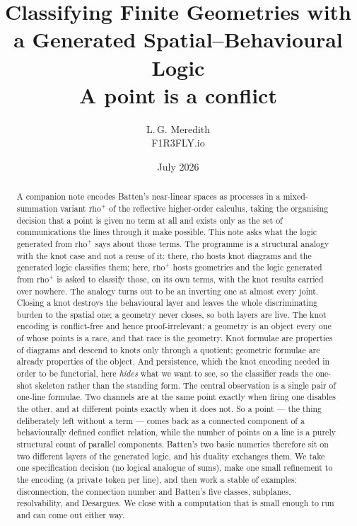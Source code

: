 \documentclass[11pt]{article}
\title{Classifying Finite Geometries with a Generated Spatial--Behavioural Logic\\
\large A point is a conflict}
\author{L.\,G. Meredith\\ \small F1R3FLY.io}
\date{July 2026}
\theoremstyle{plain}
\theoremstyle{definition}
\newcommand{\rhoplus}{\mathrm{rho}^{+}}
\begin{document}
\maketitle

\begin{abstract}
A companion note encodes Batten's near-linear spaces as processes in a mixed-summation
variant $\rhoplus$ of the reflective higher-order calculus, taking the organising decision that a
point is given no term at all and exists only as the set of communications the lines through it
make possible. This note asks what the logic generated from $\rhoplus$ says about those terms.
The programme is a structural analogy with the knot case and not a reuse of it: there,
rho hosts knot diagrams and the generated logic classifies them; here, $\rhoplus$ hosts
geometries and the logic generated from $\rhoplus$ is asked to classify those, on its own terms,
with the knot results carried over nowhere.
The analogy turns out to be an inverting one at almost every joint. Closing a knot destroys the
behavioural layer and leaves the whole discriminating burden to the spatial one; a geometry never
closes, so both layers are live. The knot encoding is conflict-free and hence proof-irrelevant; a
geometry is an object every one of whose points is a race, and that race is the geometry. Knot
formulae are properties of diagrams and descend to knots only through a quotient; geometric
formulae are already properties of the object. And persistence, which the knot encoding needed in
order to be functorial, here \emph{hides} what we want to see, so the classifier reads the
one-shot skeleton rather than the standing form.
The central observation is a single pair of one-line formulae. Two channels are at the same point
exactly when firing one disables the other, and at different points exactly when it does not. So a
point --- the thing deliberately left without a term --- comes back as a connected component of a
behaviourally defined conflict relation, while the number of points on a line is a purely
structural count of parallel components. Batten's two basic numerics therefore sit on two
different layers of the generated logic, and his duality exchanges them.
We take one specification decision (no logical analogue of sums), make one small refinement to the
encoding (a private token per line), and then work a stable of examples: disconnection, the
connection number and Batten's five classes, subplanes, resolvability, and Desargues. We close
with a computation that is small enough to run and can come out either way.
\end{abstract}
\end{document}
